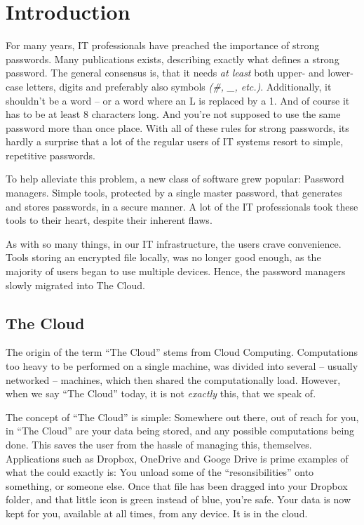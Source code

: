 \chapter{Introduction}
\label{chap:intro}
	For many years, IT professionals have preached the importance of strong passwords. Many publications exists, describing exactly what defines a strong password. The general consensus is, that it needs \emph{at least} both upper- and lower-case letters, digits and preferably also symbols \emph{(\#, \_, etc.)}. Additionally, it shouldn't be a word -- or a word where an L is replaced by a 1. And of course it has to be at least 8 characters long. And you're not supposed to use the same password more than once place. With all of these rules for strong passwords, its hardly a surprise that a lot of the regular users of IT systems resort to simple, repetitive passwords.

	To help alleviate this problem, a new class of software grew popular: Password managers. Simple tools, protected by a single master password, that generates and stores passwords, in a secure manner. A lot of the IT professionals took these tools to their heart, despite their inherent flaws. 

	As with so many things, in our IT infrastructure, the users crave convenience. Tools storing an encrypted file locally, was no longer good enough, as the majority of users began to use multiple devices. Hence, the password managers slowly migrated into The Cloud.

	\section{The Cloud}
		The origin of the term ``The Cloud'' stems from Cloud Computing. Computations too heavy to be performed on a single machine, was divided into several -- usually networked -- machines, which then shared the computationally load. However, when we say ``The Cloud'' today, it is not \emph{exactly} this, that we speak of.

		The concept of ``The Cloud'' is simple: Somewhere out there, out of reach for you, in ``The Cloud'' are your data being stored, and any possible computations being done. This saves the user from the hassle of managing this, themselves. Applications such as Dropbox, OneDrive and Googe Drive is prime examples of what the could exactly is: You unload some of the ``resonsibilities'' onto something, or someone else. Once that file has been dragged into your Dropbox folder, and that little icon is green instead of blue, you're safe. Your data is now kept for you, available at all times, from any device. It is in the cloud.

